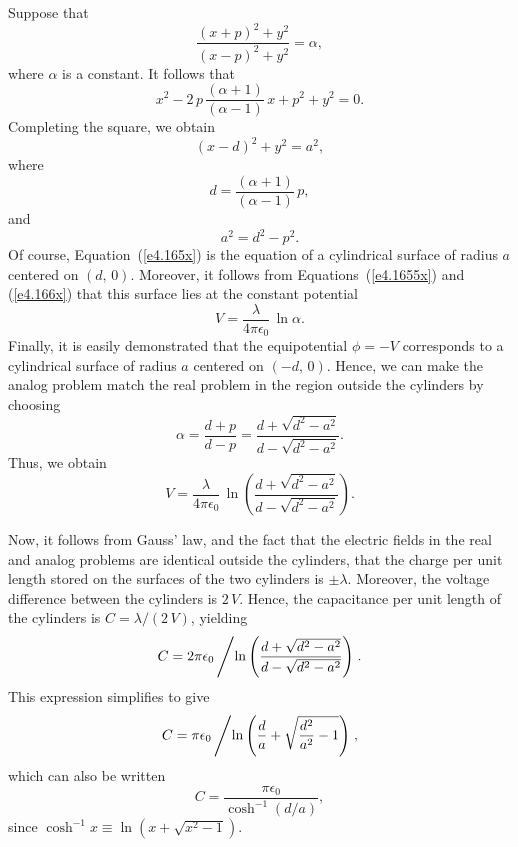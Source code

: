 Suppose that
\begin{equation}\label{e4.166x}
\frac{(x+p)^2+y^2}{(x-p)^2+y^2} = \alpha,
\end{equation}
where $\alpha$ is a constant.
It follows that
\begin{equation}
x^2 - 2\,p\,\frac{(\alpha+1)}{(\alpha-1)}\,x + p^2 + y^2 = 0.
\end{equation}
Completing the square, we obtain
\begin{equation}\label{e4.165x}
(x-d)^2 + y^2 = a^2,
\end{equation}
where
\begin{equation}
d = \frac{(\alpha+1)}{(\alpha-1)}\,p,
\end{equation}
and
\begin{equation}
a^2 = d^2 - p^2.
\end{equation}
Of course, Equation~(\ref{e4.165x}) is the equation of a cylindrical surface of radius $a$
centered on $(d,\,0)$. Moreover, it follows from Equations~(\ref{e4.1655x}) and (\ref{e4.166x}) that this surface lies at the
constant potential
\begin{equation}
V = \frac{\lambda}{4\pi\epsilon_0}\,\ln\alpha.
\end{equation}
Finally, it is easily demonstrated that the equipotential  $\phi=-V$ corresponds
to a cylindrical surface of radius $a$ centered on $(-d,\,0)$. Hence, we can make
the analog problem match the real problem in the region outside
the cylinders by choosing
\begin{equation}
\alpha = \frac{d+p}{d-p} = \frac{d+\sqrt{d^2-a^2}}{d-\sqrt{d^2-a^2}}.
\end{equation}
Thus, we obtain
\begin{equation}
V = \frac{\lambda}{4\pi\epsilon_0} \,\ln\left(\frac{d+\sqrt{d^2-a^2}}{d-\sqrt{d^2-a^2}}\right).
\end{equation}

Now, it follows from Gauss' law, and the fact that the electric fields in the
real and analog problems are identical outside the cylinders, that the
charge per unit length stored on the surfaces of the two cylinders is $\pm\lambda$. Moreover,
the voltage difference between the cylinders is $2\,V$. Hence, the
capacitance per unit length of the cylinders is $C=\lambda/(2\,V)$, yielding
\begin{equation}
C = 2\pi\epsilon_0\left/\ln\left(\frac{d+\sqrt{d^2-a^2}}{d-\sqrt{d^2-a^2}}\right)\right..
\end{equation}
This expression simplifies to give
\begin{equation}
C = \pi\epsilon_0\left/\ln\left(\frac{d}{a}+ \sqrt{\frac{d^2}{a^2}-1}\right)\right.,
\end{equation}
which can also be written
\begin{equation}
C = \frac{\pi\epsilon_0}{\cosh^{-1}(d/a)},
\end{equation}
since $\cosh^{-1}x \equiv \ln(x+\sqrt{x^2-1})$. 

